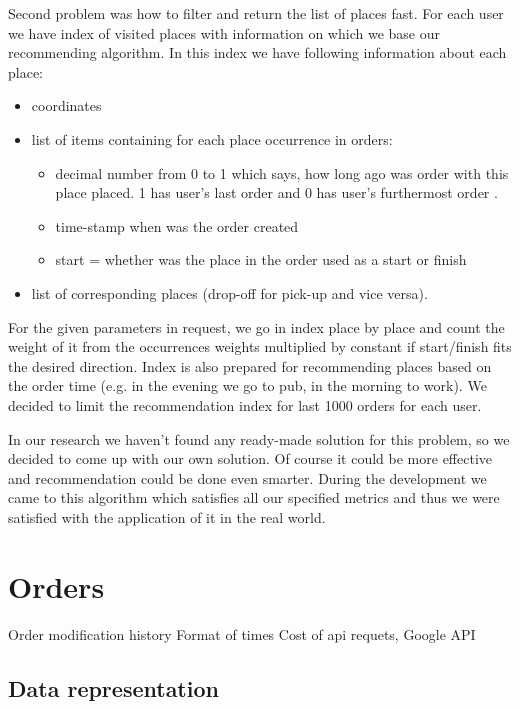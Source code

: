  Second problem was how to filter and return the list of places fast. For each user we have index of visited places with information on which we base our recommending algorithm. In this index we have following information about each place:
 \begin{itemize}
 	\item coordinates
 	\item list of items containing for each place occurrence in orders:
 	\begin{itemize}
 		\item decimal number from 0 to 1 which says, how long ago was order with this place placed. 1 has user's last order and 0 has user's furthermost order .
 		\item time-stamp when was the order created
 		\item start = whether was the place in the order used as a start or finish
 	\end{itemize}
 	\item list of corresponding places (drop-off for pick-up and vice versa).
 \end{itemize}
For the given parameters in request, we go in index place by place and count the weight of it from the occurrences weights multiplied by constant if start/finish fits the desired direction. Index is also prepared for recommending places based on the order time (e.g. in the evening we go to pub, in the morning to work). We decided to limit the recommendation index for last 1000 orders for each user.

In our research we haven't found any ready-made solution for this problem, so we decided to come up with our own solution. Of course it could be more effective and recommendation could be done even smarter. During the development we came to this algorithm which satisfies all our specified metrics and thus we were satisfied with the application of it in the real world.


\section {Orders}

Order modification history
Format of times
Cost of api requets, Google API

\subsection {Data representation}



